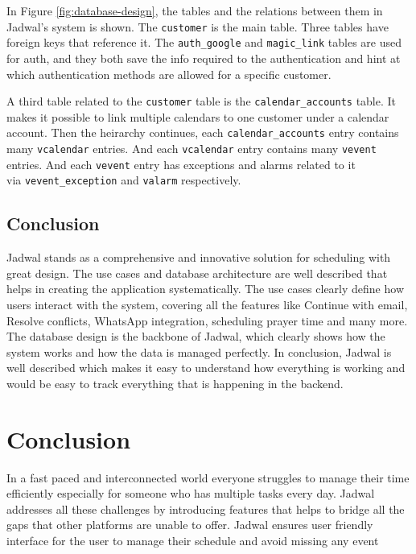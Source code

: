 \documentclass[12pt,a4paper]{report}
\begin{document}
\newpage

In Figure \ref{fig:database-design}, the tables and the relations between them in Jadwal's system is shown. The \texttt{customer} is the main table. Three tables have foreign keys that reference it. The \texttt{auth\_google} and \texttt{magic\_link} tables are used for auth, and they both save the info required to the authentication and hint at which authentication methods are allowed for a specific customer.

A third table related to the \texttt{customer} table is the \texttt{calendar\_accounts} table. It makes it possible to link multiple calendars to one customer under a calendar account. Then the heirarchy continues, each \texttt{calendar\_accounts} entry contains many \texttt{vcalendar} entries. And each \texttt{vcalendar} entry contains many \texttt{vevent} entries. And each \texttt{vevent} entry has exceptions and alarms related to it\\via \texttt{vevent\_exception} and \texttt{valarm} respectively.



\section{Conclusion}

Jadwal stands as a comprehensive and innovative solution for scheduling with great design. The use cases and database architecture are well described that helps in creating the application systematically. The use cases clearly define how users interact with the system, covering all the features like Continue with email, Resolve conflicts, WhatsApp integration, scheduling prayer time and many more. The database design is the backbone of Jadwal, which clearly shows how the system works and how the data is managed perfectly. In conclusion, Jadwal is well described which makes it easy to understand how everything is working and would be easy to track everything that is happening in the backend. 


\chapter*{Conclusion}

In a fast paced and interconnected world everyone struggles to manage their time efficiently especially for someone who has multiple tasks every day. Jadwal addresses all these challenges by introducing features that helps to bridge all the gaps that other platforms are unable to offer. Jadwal ensures user friendly interface for the user to manage their schedule and avoid missing any event
\end{document}

